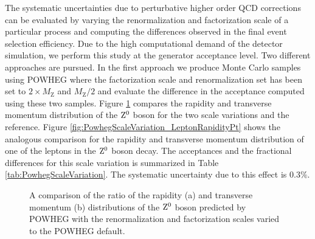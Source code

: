 \documentclass{cmspaper}
\begin{document}
The systematic uncertainties due to perturbative higher order QCD corrections can be evaluated by varying the renormalization and factorization scale of a particular process and computing the differences observed in the final event selection efficiency. Due to the high computational demand of the detector simulation, we perform this study at the generator acceptance level. Two different approaches are pursued. In the first approach we produce Monte Carlo samples using POWHEG where the factorization scale and renormalization set has been set to $2\times M_{\mathrm{Z}}$ and $M_{\mathrm{Z}}/2$ and evaluate the difference in the acceptance computed using these two samples. Figure \ref{fig:PowhegScaleVariation_ZRapidityPt} compares the rapidity and transverse momentum distribution of the $\mathrm{Z^0}$ boson for the two scale variations and the reference. Figure \ref{fig:PowhegScaleVariation_LeptonRapidityPt} shows the analogous comparison for the rapidity and transverse momentum distribution of one of the leptons in the $\mathrm{Z^0}$ boson decay. The acceptances and the fractional differences for this scale variation is summarized in Table \ref{tab:PowhegScaleVariation}. The systematic uncertainty due to this effect is $0.3\%$. 

\begin{figure}[htb]
  \begin{center}
    \caption{A comparison of the ratio of the rapidity (a) and transverse momentum (b) distributions of the $\mathrm{Z^0}$ boson predicted by POWHEG with the renormalization and factorization scales varied to the POWHEG default.}
    \label{fig:PowhegScaleVariation_ZRapidityPt}
  \end{center}
\end{figure}
\end{document}
